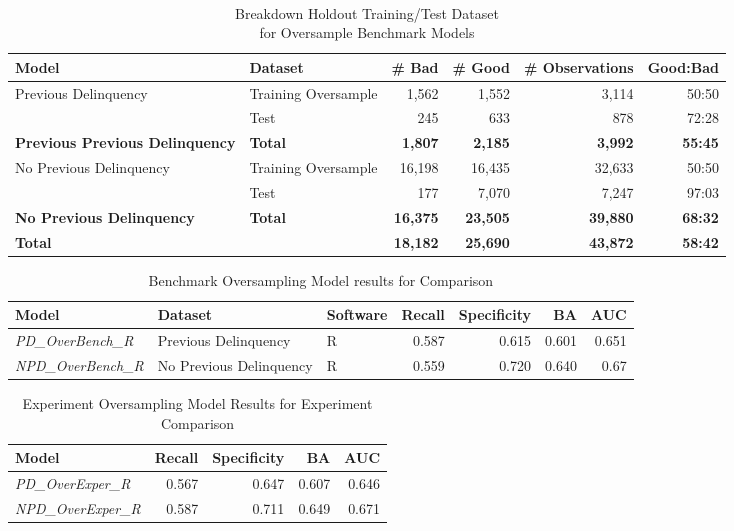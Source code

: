 \begin{table}[H]
	\centering\
	\resizebox{\textwidth}{!}
	{
		\begin{tabular}{l l r r r r}
			\hline
			\textbf{Model} &  \textbf{Dataset} & \textbf{\# Bad} & \textbf{\# Good} & \textbf{\# Observations} & \textbf{Good:Bad} \\
			\hline
			Previous Delinquency & Training Oversample & 1,562 & 1,552 & 3,114 & 50:50\\
			& Test & 245 & 633 & 878 & 72:28\\\hline
			\textbf{Previous Previous Delinquency}     & \textbf{Total} & \textbf{1,807} & \textbf{2,185} & \textbf{3,992} & \textbf{55:45} \\
			\hline
			No Previous Delinquency & Training Oversample & 16,198 & 16,435 & 32,633 & 50:50 \\ 
			& Test & 177 & 7,070 & 7,247 & 97:03 	\\\hline
			\textbf{No Previous Delinquency}     & \textbf{Total} & \textbf{16,375} & \textbf{23,505} & \textbf{39,880} & \textbf{68:32} \\
			\hline
			\textbf{Total } 	&     	     & \textbf{18,182} & \textbf{25,690} & \textbf{43,872} & \textbf{58:42}\\ \hline
		\end{tabular}
	}
	\caption{Breakdown Holdout Training/Test Dataset \\for Oversample Benchmark Models}
	\label{table:benchmark_holdout_oversample_train_test}
\end{table}

\begin{table}[H]
	\centering
	\resizebox{\textwidth}{!}
	{
		\begin{tabular}{l l l r r r r}
			\hline
			\textbf{Model} & \textbf{Dataset} & \textbf{Software} & \textbf{Recall} & \textbf{Specificity} & \textbf{BA} & \textbf{AUC}  \\ \hline
			\textit{PD\_OverBench\_R} & Previous Delinquency & R & 0.587 & 0.615 & 0.601 & 0.651   \\ \hline
			\textit{NPD\_OverBench\_R} & No Previous Delinquency & R & 0.559 & 0.720 & 0.640 & 0.67   \\ \hline
		\end{tabular}
	}
	\caption{Benchmark Oversampling Model results for Comparison}
	\label{table:benchmodelOver}
\end{table}

\begin{table}[H]
\centering
\small
		\begin{tabular}{l  r r r r}
			\hline
			\textbf{Model} & \textbf{Recall} & \textbf{Specificity} & \textbf{BA} & \textbf{AUC}  \\ \hline
			\textit{PD\_OverExper\_R}  & 0.567 & 0.647 & 0.607 & 0.646   \\ \hline
			\textit{NPD\_OverExper\_R} & 0.587 & 0.711 & 0.649 & 0.671   \\ \hline
		\end{tabular}
	\caption{Experiment Oversampling Model Results for Experiment Comparison}
	\label{table:benchmodelOverExper}
\end{table}



